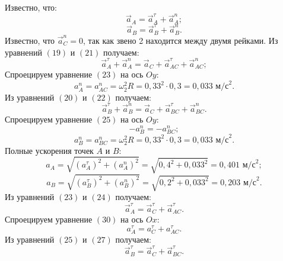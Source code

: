 \documentclass{article}
\begin{document}
\medskip
Известно, что:
\begin{equation}
    \vec{a}_A = \vec{a}_A^\tau + \vec{a}_A^n;
\end{equation}
\begin{equation}
    \vec{a}_B = \vec{a}_B^\tau + \vec{a}_B^n.
\end{equation}
\medskip
Известно, что $\vec{a}_C^n = 0$, так как звено 2 находится между двумя рейками. Из уравнений $(19)$ и $(21)$ получаем:
\begin{equation}
    \vec{a}_A^\tau + \vec{a}_A^n = \vec{a}_C + \vec{a}_{AC}^\tau + \vec{a}_{AC}^n;
\end{equation}
\medskip
Спроецируем уравнение $(23)$ на ось $Oy$:
\begin{equation}
    {a}_A^n = {a}_{AC}^n = \omega_2^2R = 0,33^2 \cdot 0,3 = 0,033 {\text{ м/с}}^2.
\end{equation}
\medskip
Из уравнений $(20)$ и $(22)$ получаем:
\begin{equation}
    \vec{a}_B^\tau + \vec{a}_B^n = \vec{a}_C + \vec{a}_{BC}^\tau + \vec{a}_{BC}^n.
\end{equation}
\medskip
Спроецируем уравнение $(25)$ на ось $Oy$:
\begin{equation}
    -{a}_B^n = -{a}_{BC}^n;
\end{equation}
\begin{equation}
    {a}_B^n = {a}_{BC}^n = \omega_2^2R =0,33^2 \cdot 0,3 =0,033 {\text{ м/с}}^2.
\end{equation}
\medskip
Полные ускорения точек $A$ и $B$:
\begin{equation}
a_A = \sqrt{(a_A^\tau)^2 + (a_A^n)^2} = \sqrt{0,4^2 + 0,033^2} = 0,401 \text{ м/с}^2;
\end{equation}
\begin{equation}
a_B = \sqrt{(a_B^\tau)^2 + (a_B^n)^2} = \sqrt{0,2^2 + 0,033^2} = 0,203 \text{ м/с}^2.
\end{equation}
\medskip
Из уравнений $(23)$ и $(24)$ получаем:
\begin{equation}
    \vec{a}_A^\tau = \vec{a}_C^\tau +\vec{a}_{AC}^\tau.
\end{equation}
\medskip
Спроецируем уравнение $(30)$ на ось $Ox$:
\begin{equation}
    {a}_A^\tau = {a}_C^\tau +{a}_{AC}^\tau.
\end{equation}
\medskip
Из уравнений $(25)$ и $(27)$ получаем:
\begin{equation}
    \vec{a}_B^\tau = \vec{a}_C^\tau +\vec{a}_{BC}^\tau.
\end{equation}
\end{document}
